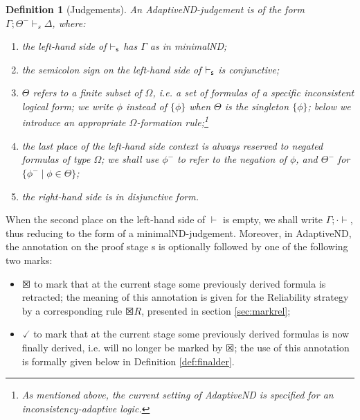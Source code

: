 \documentclass[]{article}
\newtheorem{definition}{Definition}
\begin{document}
\begin{definition}[Judgements]
An {\sf AdaptiveND}-judgement is of the form $\Gamma; \Theta^{-}\vdash_{s} \Delta$, where:

\begin{enumerate}
\item the left-hand side of $\vdash_{\sf s}$ has $\Gamma$ as in {\sf minimalND};
\item the semicolon sign on the left-hand side of $\vdash_{\sf s}$ is conjunctive;
\item $\Theta$ refers to a finite subset of $\Omega$, i.e. a set of formulas of a specific inconsistent logical form; we write $\phi$ instead of $\{\phi\}$ when $\Theta$ is the singleton $\{\phi\}$; below we introduce an appropriate $\Omega$-formation rule;\footnote{As mentioned above, the current setting of {\sf AdaptiveND} is specified for an inconsistency-adaptive logic.}
\item the last place of the left-hand side context is always reserved to negated formulas of type $\Omega$; we shall use $\phi^{-}$ to refer to the negation of $\phi$, and $\Theta^-$ for $\{\phi^- \mid \phi \in \Theta\}$;
\item the right-hand side is in disjunctive form.
\end{enumerate}
\end{definition}
%
When the second place on the left-hand side of $\vdash$ is empty, we shall write $\Gamma;\cdot\vdash$, thus reducing to the form of a {\sf minimalND}-judgement.
Moreover, in {\sf AdaptiveND}, the annotation on the proof stage {\sf s} is optionally followed by one of the following two marks:

\begin{itemize}
\item[]  $\XBox$ to mark that at the current stage some previously derived formula is retracted; the meaning of this annotation is given for the Reliability strategy by a corresponding rule $\XBox R$, presented in section \ref{sec:markrel};
\item[] $\checked$ to mark that at the current stage some previously derived formulas is now finally derived, i.e. will no longer be marked by $\XBox$; the use of this annotation is formally given below in Definition \ref{def:finalder}.
\end{itemize}
\end{document}
